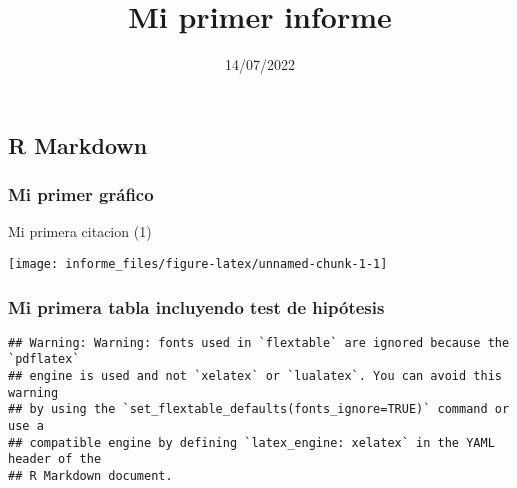 \documentclass[
]{article}
\title{Mi primer informe}
\author{}
\date{\vspace{-2.5em}14/07/2022}
\begin{document}
\maketitle

{
\setcounter{tocdepth}{3}
\tableofcontents
}
\hypertarget{r-markdown}{%
\subsection{R Markdown}\label{r-markdown}}

\hypertarget{mi-primer-gruxe1fico}{%
\subsubsection{Mi primer gráfico}\label{mi-primer-gruxe1fico}}

Mi primera citacion (1)

\begin{center}\texttt{[image: informe\_files/figure-latex/unnamed-chunk-1-1]} \end{center}

\hypertarget{mi-primera-tabla-incluyendo-test-de-hipuxf3tesis}{%
\subsubsection{Mi primera tabla incluyendo test de
hipótesis}\label{mi-primera-tabla-incluyendo-test-de-hipuxf3tesis}}

\begin{verbatim}
## Warning: Warning: fonts used in `flextable` are ignored because the `pdflatex`
## engine is used and not `xelatex` or `lualatex`. You can avoid this warning
## by using the `set_flextable_defaults(fonts_ignore=TRUE)` command or use a
## compatible engine by defining `latex_engine: xelatex` in the YAML header of the
## R Markdown document.
\end{verbatim}

\providecommand{\docline}[3]{\noalign{\global\setlength{\arrayrulewidth}{#1}}\arrayrulecolor[HTML]{#2}\cline{#3}}

\setlength{\tabcolsep}{2pt}

\renewcommand*{\arraystretch}{1.5}
\end{document}
